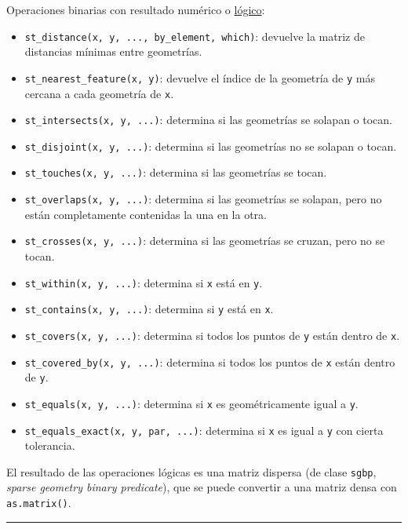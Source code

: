 \documentclass[
  spanish,
]{book}
\providecommand{\tightlist}{%
  \setlength{\itemsep}{0pt}\setlength{\parskip}{0pt}}
\theoremstyle{break}
\theoremstyle{definition}
\theoremstyle{definition}
\theoremstyle{definition}
\theoremstyle{definition}
\theoremstyle{remark}
\begin{document}
Operaciones binarias con resultado numérico o \href{https://r-spatial.github.io/sf/reference/geos_binary_pred.html}{lógico}:

\begin{itemize}
\tightlist
\item
  \texttt{st\_distance(x,\ y,\ ...,\ by\_element,\ which)}: devuelve la matriz de distancias mínimas entre geometrías.
\item
  \texttt{st\_nearest\_feature(x,\ y)}: devuelve el índice de la geometría de \texttt{y} más cercana a cada geometría de \texttt{x}.
\item
  \texttt{st\_intersects(x,\ y,\ ...)}: determina si las geometrías se solapan o tocan.
\item
  \texttt{st\_disjoint(x,\ y,\ ...)}: determina si las geometrías no se solapan o tocan.
\item
  \texttt{st\_touches(x,\ y,\ ...)}: determina si las geometrías se tocan.
\item
  \texttt{st\_overlaps(x,\ y,\ ...)}: determina si las geometrías se solapan, pero no están completamente contenidas la una en la otra.
\item
  \texttt{st\_crosses(x,\ y,\ ...)}: determina si las geometrías se cruzan, pero no se tocan.
\item
  \texttt{st\_within(x,\ y,\ ...)}: determina si \texttt{x} está en \texttt{y}.
\item
  \texttt{st\_contains(x,\ y,\ ...)}: determina si \texttt{y} está en \texttt{x}.
\item
  \texttt{st\_covers(x,\ y,\ ...)}: determina si todos los puntos de \texttt{y} están dentro de \texttt{x}.
\item
  \texttt{st\_covered\_by(x,\ y,\ ...)}: determina si todos los puntos de \texttt{x} están dentro de \texttt{y}.
\item
  \texttt{st\_equals(x,\ y,\ ...)}: determina si \texttt{x} es geométricamente igual a \texttt{y}.
\item
  \texttt{st\_equals\_exact(x,\ y,\ par,\ ...)}: determina si \texttt{x} es igual a \texttt{y} con cierta tolerancia.
\end{itemize}

El resultado de las operaciones lógicas es una matriz dispersa (de clase \texttt{sgbp}, \emph{sparse geometry binary predicate}), que se puede convertir a una matriz densa con \texttt{as.matrix()}.

\begin{center}\rule{0.5\linewidth}{0.5pt}\end{center}
\end{document}
